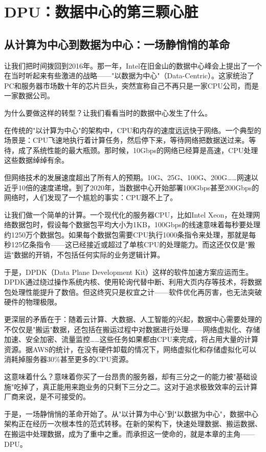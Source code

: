 \section{DPU：数据中心的第三颗心脏}

\subsection{从计算为中心到数据为中心：一场静悄悄的革命}

让我们把时间拨回到2016年。那一年，Intel在旧金山的数据中心峰会上提出了一个在当时听起来有些激进的战略——"以数据为中心"（Data-Centric）。这家统治了PC和服务器市场数十年的芯片巨头，突然宣称自己不再只是一家CPU公司，而是一家数据公司。

为什么要做这样的转型？让我们看看当时的数据中心发生了什么。

在传统的"以计算为中心"的架构中，CPU和内存的速度远远快于网络。一个典型的场景是：CPU飞速地执行着计算任务，然后停下来，等待网络把数据送过来。等待，成了系统性能的最大瓶颈。那时候，10Gbps的网络已经算是高速，CPU处理这些数据绰绰有余。

但网络技术的发展速度超出了所有人的预期。10G、25G、100G、200G……网速以近乎10倍的速度递增。到了2020年，当数据中心开始部署100Gbps甚至200Gbps的网络时，人们发现了一个尴尬的事实：CPU跟不上了。

让我们做一个简单的计算。一个现代化的服务器CPU，比如Intel Xeon，在处理网络数据包时，假设每个数据包平均大小为1KB，100Gbps的线速意味着每秒要处理约1250万个数据包。如果每个数据包需要CPU执行1000条指令来处理，那就是每秒125亿条指令——这已经接近或超过了单核CPU的处理能力。而这还仅仅是"搬运"数据的开销，不包括任何实际的业务逻辑计算。

于是，DPDK（Data Plane Development Kit）这样的软件加速方案应运而生。DPDK通过绕过操作系统内核、使用轮询代替中断、利用大页内存等技术，将数据包处理性能提升了数倍。但这终究只是权宜之计——软件优化再厉害，也无法突破硬件的物理极限。

更深层的矛盾在于：随着云计算、大数据、人工智能的兴起，数据中心需要处理的不仅仅是"搬运"数据，还包括在搬运过程中对数据进行处理——网络虚拟化、存储加速、安全加密、流量监控……这些任务如果都由CPU来完成，将占用大量的计算资源。据AWS的统计，在没有硬件卸载的情况下，网络虚拟化和存储虚拟化可以消耗掉服务器30\%甚至更多的CPU资源。

这意味着什么？意味着你买了一台昂贵的服务器，却有三分之一的能力被"基础设施"吃掉了，真正能用来跑业务的只剩下三分之二。这对于追求极致效率的云计算厂商来说，是不可接受的。

于是，一场静悄悄的革命开始了。从"以计算为中心"到"以数据为中心"，数据中心架构正在经历一次根本性的范式转移。在新的架构下，快速处理数据、搬运数据、在搬运中处理数据，成为了重中之重。而承担这一使命的，就是本章的主角——DPU。

